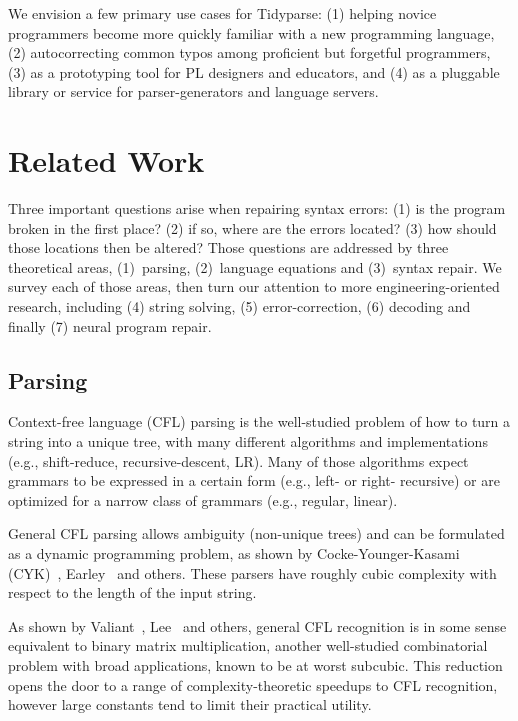 \documentclass[sigplan,acmsmall,nonacm,screen]{acmart}\settopmatter{printfolios=false,printccs=false,printacmref=false}
\begin{document}

  We envision a few primary use cases for Tidyparse: (1) helping novice programmers become more quickly familiar with a new programming language, (2) autocorrecting common typos among proficient but forgetful programmers, (3) as a prototyping tool for PL designers and educators, and (4) as a pluggable library or service for parser-generators and language servers.

  \section{Related Work}\label{sec:related}

  Three important questions arise when repairing syntax errors: (1) is the program broken in the first place? (2) if so, where are the errors located? (3) how should those locations then be altered? Those questions are addressed by three theoretical areas, (1)~parsing, (2)~language equations and (3)~syntax repair. We survey each of those areas, then turn our attention to more engineering-oriented research, including (4) string solving, (5) error-correction, (6) decoding and finally (7) neural program repair.

  \subsection{Parsing}

  Context-free language (CFL) parsing is the well-studied problem of how to turn a string into a unique tree, with many different algorithms and implementations (e.g., shift-reduce, recursive-descent, LR). Many of those algorithms expect grammars to be expressed in a certain form (e.g., left- or right- recursive) or are optimized for a narrow class of grammars (e.g., regular, linear).

  General CFL parsing allows ambiguity (non-unique trees) and can be formulated as a dynamic programming problem, as shown by Cocke-Younger-Kasami (CYK)~\cite{sakai1961syntax}, Earley~\cite{earley1970efficient} and others. These parsers have roughly cubic complexity with respect to the length of the input string.

  As shown by Valiant~\cite{valiant1975general}, Lee~\cite{lee2002fast} and others, general CFL recognition is in some sense equivalent to binary matrix multiplication, another well-studied combinatorial problem with broad applications, known to be at worst subcubic. This reduction opens the door to a range of complexity-theoretic speedups to CFL recognition, however large constants tend to limit their practical utility.
\end{document}
